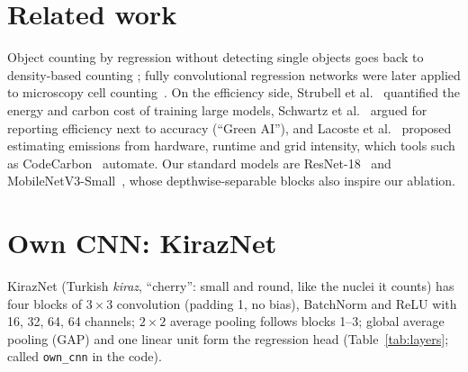 \documentclass[11pt,a4paper]{article}
\newcommand{\kn}{KirazNet}
\begin{document}
\section{Related work}
Object counting by regression without detecting single objects goes back to density-based counting
\cite{lempitsky2010}; fully convolutional regression networks were later applied to microscopy cell
counting~\cite{xie2018}. On the efficiency side, Strubell et al.~\cite{strubell2019} quantified the
energy and carbon cost of training large models, Schwartz et al.~\cite{schwartz2020} argued for
reporting efficiency next to accuracy (``Green AI''), and Lacoste et al.~\cite{lacoste2019} proposed
estimating emissions from hardware, runtime and grid intensity, which tools such as
CodeCarbon~\cite{codecarbon} automate. Our standard models are ResNet-18~\cite{he2016} and
MobileNetV3-Small~\cite{howard2019}, whose depthwise-separable blocks also inspire our ablation.

\section{Own CNN: \kn}

\kn{} (Turkish \emph{kiraz}, ``cherry'': small and round, like the nuclei it counts) has four blocks of
$3\times3$ convolution (padding 1, no bias), BatchNorm and ReLU with 16, 32, 64, 64 channels; $2\times2$
average pooling follows blocks 1--3; global average pooling (GAP) and one linear unit form the
regression head (Table~\ref{tab:layers}; called \texttt{own\_cnn} in the code).
\end{document}
